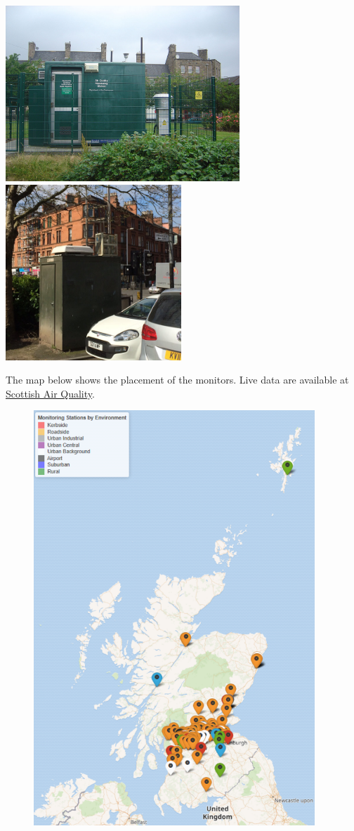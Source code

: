 \documentclass[
  letterpaper,
  DIV=11,
  numbers=noendperiod]{scrartcl}
\begin{document}
\begin{tcolorbox}
\includegraphics[width=\textwidth,height=2.60417in]{images/EdinburghStation.jpg}
\includegraphics[width=\textwidth,height=2.60417in]{images/GlasgowStation.jpg}

The map below shows the placement of the monitors. Live data are
available at \href{http://www.scottishairquality.scot/}{Scottish Air
Quality}.

\begin{figure}[H]

{\centering \includegraphics[width=4.16667in,height=\textheight]{images/Monitor4.png}

}
\end{figure}
\end{tcolorbox}
\end{document}
